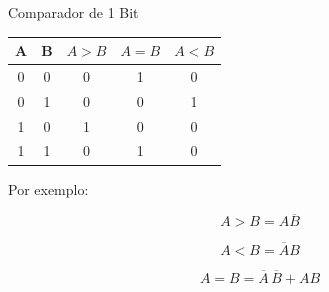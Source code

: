 \begin{frame}{Comparador de 1 Bit}

    \begin{center}
        \begin{tabular}{c c | c c c}
            \hline
            A & B & $A>B$ & $A=B$ & $A<B$ \\
            \hline
            0 & 0 & 0 & 1 & 0 \\
            0 & 1 & 0 & 0 & 1 \\
            1 & 0 & 1 & 0 & 0 \\
            1 & 1 & 0 & 1 & 0 \\
            \hline
        \end{tabular}
    \end{center}

    \vspace{0.5cm}

    Por exemplo:

    \[
        A>B=A\overline{B}
    \]

    \[
        A<B=\overline{A}B
    \]

    \[
        A=B=\overline{A}\,\overline{B}+AB
    \]

\end{frame}